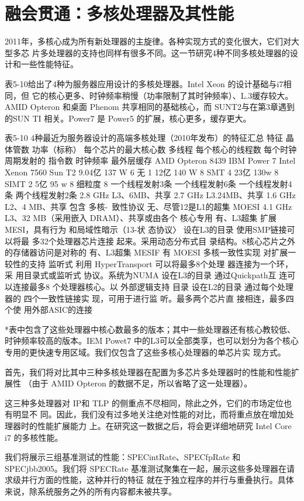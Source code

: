 \section{融会贯通：多核处理器及其性能}
2011年，多核心成为所有新处理器的主旋律。各种实现方式的变化很大，它们对大型多芯
片多处理器的支持也同样有很多不同。这一节研究4种不同多核处理器的设计和一些性能特征。

表5-10给出了4种为服务器应用设计的多核处理器。Intel Xeon 的设计基础与i7相同，但
它的核心更多、时钟频率稍慢（功率限制了其时钟频率）、L.3缓存较大。AMID Opteron 和桌面
Phenom 共享相同的基础核心，而 SUNT2与在第3章遇到的SUN TI 相关。Power7 是 Power5
的扩展，核心更多，缓存更大。

表5-10 4种最近为服务器设计的高端多核处理（2010年发布）的特征汇总
特征
晶体管数
功率（标称）
每个芯片的最大核心数
多线程
每个核心的线程数
每个时钟周期发射的
指令数
时钟频率
最外层缓存
AMD Opteron 8439
IBM Power 7
Intel Xenon 7560
Sun T2
9.04亿
137 W
6
无
1
12亿
140 W
8
SMT
4
23亿
130w
8
SIMT
2
5亿
95 w
8
细粒度
8
一个线程发射3条
一个线程发射6条
一个线程发射4条
两个线程发射2条
2.8 GHz
L3、6MB、共享
2.7 GHz
L3.24MB、共享
1.6 GHz
L2、4 MB、共享
包含
多核-~致性协议
无、尽管12是L1的超集
MOESI
4.1 GHz
L3、32 MB（采用嵌入
DRAM）、共享或由各个
核心专用
有、L3超集
扩展MESI，具有行为
和局域性暗示（13-状
态协议〉
设在L3的目录
使用SMP链接可以将最
多32个处理器芯片连接
起来。采用动态分布式目
录结构。8核心芯片之外
的存储器访问是对称的
有、L3超集
MESIF
有
MOESI
多核一致性实现
对扩展一较性的支持
监听式
利用 HyperTransport
可以将最多8个处理
器连接为一个环，采
用目录式或监听式
协议。系统为NUMA
设在L3的目录
通过Quickpath互
连可以连接最多8
个处理器核心。以
外部逻辑支持
目录
设在L2的目录
通过每个处理器的
四个一致性链接实
现，可用于进行监
听。最多两个芯片直
接相连，最多四个使
用外部ASIC的连接

*表中包含了这些处理器中核心数最多的版本；其中一些处理器还有核心教较低、时钟频率较高的版本。IEM Powet7
中的L3可以全部类享，也可以划分为各个核心专用的更快速专用区域。我们仅包含了这些多核心处理器的单芯片实
现方式。

首先，我们将对比其中三种多核处理器在配置为多芯片多处理器时的性能和性能扩展性
（由于 AMID Opteron 的数据不足，所以省略了这一处理器）。

这三种多处理器对 IP和 TLP 的侧重点不尽相同，除此之外，它们的市场定位也有明显不
同。因此，我们没有过多地关注绝对性能的对比，而将重点放在增加处理器时的性能扩展能力
上。在研究这一数据之后，将会更详细地研究 Intel Core i7 的多核性能。

我们将展示三组基准测试的性能：SPECintRate、SPECfpRate 和 SPECjbb2005。我们将
SPECRate 基准测试聚集在一起，展示这些多处理器在请求级并行方面的性能，这种并行的特征
就在于独立程序的并行与重叠执行。具体来说，除系统服务之外的所有内容都未被共享。

